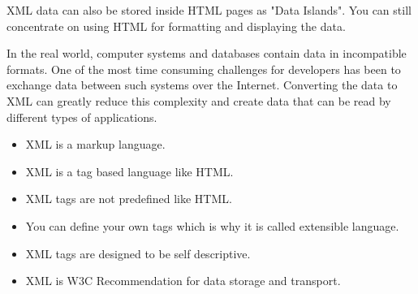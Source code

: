 \documentclass[a4paper,12pt]{article}
\begin{document}
\begin{itemize}
\begin{itemize}
XML data can also be stored inside HTML pages as "Data Islands". You can still concentrate on using HTML for formatting and displaying the data. 

In the real world, computer systems and databases contain data in incompatible formats. One of the most time consuming challenges for developers has been to exchange data between such systems over the Internet. Converting the data to XML can greatly reduce this complexity and create data that can be read by different types of applications.
	\begin{itemize}
	\item XML is a markup language.

    \item  XML is a tag based language like HTML.

    \item XML tags are not predefined like HTML.

    \item  You can define your own tags which is why it is called extensible language.

    \item XML tags are designed to be self descriptive.

     \item XML is W3C Recommendation for data storage and transport.
	\end{itemize}
	

	\end{itemize}
\end{itemize}
\end{document}
